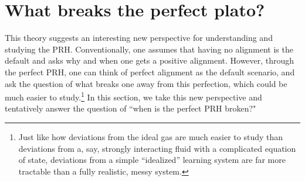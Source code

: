 \documentclass[11pt]{article}
\theoremstyle{plain}
\begin{document}
\section{What breaks the perfect plato?}

This theory suggests an interesting new perspective for understanding and studying the PRH. Conventionally, one assumes that having no alignment is the default and asks why and when one gets a positive alignment. However, through the perfect PRH, one can think of perfect alignment as the default scenario, and ask the question of what breaks one away from this perfection, which could be much easier to study.\footnote{Just like how deviations from the ideal gas are much easier to study than deviations from a, say, strongly interacting fluid with a complicated equation of state, deviations from a simple ``idealized” learning system are far more tractable than a fully realistic, messy system.} In this section, we take this new perspective and tentatively answer the question of ``when is the perfect PRH broken?"
\end{document}
